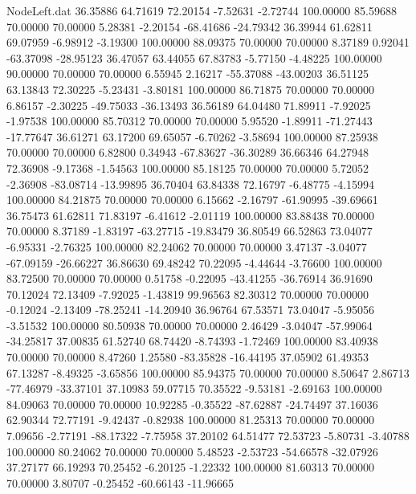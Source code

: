 \begin{filecontents}{NodeLeft.dat}
  36.35886   64.71619   72.20154    -7.52631   -2.72744  100.00000   85.59688   70.00000   70.00000    5.28381   -2.20154  -68.41686  -24.79342
  36.39944   61.62811   69.07959    -6.98912   -3.19300  100.00000   88.09375   70.00000   70.00000    8.37189    0.92041  -63.37098  -28.95123
  36.47057   63.44055   67.83783    -5.77150   -4.48225  100.00000   90.00000   70.00000   70.00000    6.55945    2.16217  -55.37088  -43.00203
  36.51125   63.13843   72.30225    -5.23431   -3.80181  100.00000   86.71875   70.00000   70.00000    6.86157   -2.30225  -49.75033  -36.13493
  36.56189   64.04480   71.89911    -7.92025   -1.97538  100.00000   85.70312   70.00000   70.00000    5.95520   -1.89911  -71.27443  -17.77647
  36.61271   63.17200   69.65057    -6.70262   -3.58694  100.00000   87.25938   70.00000   70.00000    6.82800    0.34943  -67.83627  -36.30289
  36.66346   64.27948   72.36908    -9.17368   -1.54563  100.00000   85.18125   70.00000   70.00000    5.72052   -2.36908  -83.08714  -13.99895
  36.70404   63.84338   72.16797    -6.48775   -4.15994  100.00000   84.21875   70.00000   70.00000    6.15662   -2.16797  -61.90995  -39.69661
  36.75473   61.62811   71.83197    -6.41612   -2.01119  100.00000   83.88438   70.00000   70.00000    8.37189   -1.83197  -63.27715  -19.83479
  36.80549   66.52863   73.04077    -6.95331   -2.76325  100.00000   82.24062   70.00000   70.00000    3.47137   -3.04077  -67.09159  -26.66227
  36.86630   69.48242   70.22095    -4.44644   -3.76600  100.00000   83.72500   70.00000   70.00000    0.51758   -0.22095  -43.41255  -36.76914
  36.91690   70.12024   72.13409    -7.92025   -1.43819   99.96563   82.30312   70.00000   70.00000   -0.12024   -2.13409  -78.25241  -14.20940
  36.96764   67.53571   73.04047    -5.95056   -3.51532  100.00000   80.50938   70.00000   70.00000    2.46429   -3.04047  -57.99064  -34.25817
  37.00835   61.52740   68.74420    -8.74393   -1.72469  100.00000   83.40938   70.00000   70.00000    8.47260    1.25580  -83.35828  -16.44195
  37.05902   61.49353   67.13287    -8.49325   -3.65856  100.00000   85.94375   70.00000   70.00000    8.50647    2.86713  -77.46979  -33.37101
  37.10983   59.07715   70.35522    -9.53181   -2.69163  100.00000   84.09063   70.00000   70.00000   10.92285   -0.35522  -87.62887  -24.74497
  37.16036   62.90344   72.77191    -9.42437   -0.82938  100.00000   81.25313   70.00000   70.00000    7.09656   -2.77191  -88.17322   -7.75958
  37.20102   64.51477   72.53723    -5.80731   -3.40788  100.00000   80.24062   70.00000   70.00000    5.48523   -2.53723  -54.66578  -32.07926
  37.27177   66.19293   70.25452    -6.20125   -1.22332  100.00000   81.60313   70.00000   70.00000    3.80707   -0.25452  -60.66143  -11.96665

\end{filecontents}
